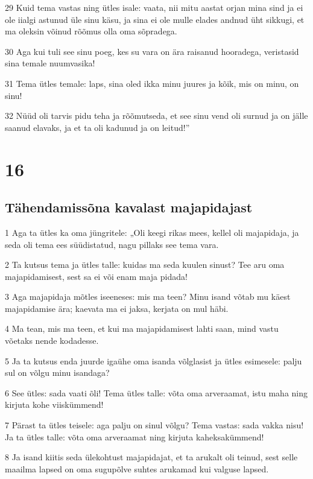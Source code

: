 \par 29 Kuid tema vastas ning ütles isale: vaata, nii mitu aastat orjan mina sind ja ei ole iialgi astunud üle sinu käsu, ja sina ei ole mulle elades andnud üht sikkugi, et ma oleksin võinud rõõmus olla oma sõpradega.
\par 30 Aga kui tuli see sinu poeg, kes su vara on ära raisanud hooradega, veristasid sina temale nuumvasika!
\par 31 Tema ütles temale: laps, sina oled ikka minu juures ja kõik, mis on minu, on sinu!
\par 32 Nüüd oli tarvis pidu teha ja rõõmutseda, et see sinu vend oli surnud ja on jälle saanud elavaks, ja et ta oli kadunud ja on leitud!”


\chapter{16}

\section*{Tähendamissõna kavalast majapidajast}

\par 1 Aga ta ütles ka oma jüngritele: „Oli keegi rikas mees, kellel oli majapidaja, ja seda oli tema ees süüdistatud, nagu pillaks see tema vara.
\par 2 Ta kutsus tema ja ütles talle: kuidas ma seda kuulen sinust? Tee aru oma majapidamisest, sest sa ei või enam maja pidada!
\par 3 Aga majapidaja mõtles iseeneses: mis ma teen? Minu isand võtab mu käest majapidamise ära; kaevata ma ei jaksa, kerjata on mul häbi.
\par 4 Ma tean, mis ma teen, et kui ma majapidamisest lahti saan, mind vastu võetaks nende kodadesse.
\par 5 Ja ta kutsus enda juurde igaühe oma isanda võlglasist ja ütles esimesele: palju sul on võlgu minu isandaga?
\par 6 See ütles: sada vaati õli! Tema ütles talle: võta oma arveraamat, istu maha ning kirjuta kohe viiskümmend!
\par 7 Pärast ta ütles teisele: aga palju on sinul võlgu? Tema vastas: sada vakka nisu! Ja ta ütles talle: võta oma arveraamat ning kirjuta kaheksakümmend!
\par 8 Ja isand kiitis seda ülekohtust majapidajat, et ta arukalt oli teinud, sest selle maailma lapsed on oma sugupõlve suhtes arukamad kui valguse lapsed.

